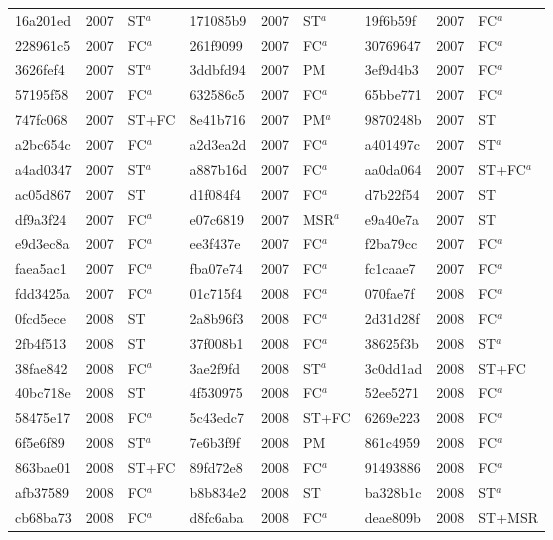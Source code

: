 \begin{longtable}{lll@{\hspace{10pt}}lll@{\hspace{10pt}}lll}
16a201ed & 2007 & ST$^{a}$ & 171085b9 & 2007 & ST$^{a}$ & 19f6b59f & 2007 & FC$^{a}$ \\
228961c5 & 2007 & FC$^{a}$ & 261f9099 & 2007 & FC$^{a}$ & 30769647 & 2007 & FC$^{a}$ \\
3626fef4 & 2007 & ST$^{a}$ & 3ddbfd94 & 2007 & PM & 3ef9d4b3 & 2007 & FC$^{a}$ \\
57195f58 & 2007 & FC$^{a}$ & 632586c5 & 2007 & FC$^{a}$ & 65bbe771 & 2007 & FC$^{a}$ \\
747fc068 & 2007 & ST+FC & 8e41b716 & 2007 & PM$^{a}$ & 9870248b & 2007 & ST \\
a2bc654c & 2007 & FC$^{a}$ & a2d3ea2d & 2007 & FC$^{a}$ & a401497c & 2007 & ST$^{a}$ \\
a4ad0347 & 2007 & ST$^{a}$ & a887b16d & 2007 & FC$^{a}$ & aa0da064 & 2007 & ST+FC$^{a}$ \\
ac05d867 & 2007 & ST & d1f084f4 & 2007 & FC$^{a}$ & d7b22f54 & 2007 & ST \\
df9a3f24 & 2007 & FC$^{a}$ & e07c6819 & 2007 & MSR$^{a}$ & e9a40e7a & 2007 & ST \\
e9d3ec8a & 2007 & FC$^{a}$ & ee3f437e & 2007 & FC$^{a}$ & f2ba79cc & 2007 & FC$^{a}$ \\
faea5ac1 & 2007 & FC$^{a}$ & fba07e74 & 2007 & FC$^{a}$ & fc1caae7 & 2007 & FC$^{a}$ \\
fdd3425a & 2007 & FC$^{a}$ & 01c715f4 & 2008 & FC$^{a}$ & 070fae7f & 2008 & FC$^{a}$ \\
0fcd5ece & 2008 & ST & 2a8b96f3 & 2008 & FC$^{a}$ & 2d31d28f & 2008 & FC$^{a}$ \\
2fb4f513 & 2008 & ST & 37f008b1 & 2008 & FC$^{a}$ & 38625f3b & 2008 & ST$^{a}$ \\
38fae842 & 2008 & FC$^{a}$ & 3ae2f9fd & 2008 & ST$^{a}$ & 3c0dd1ad & 2008 & ST+FC \\
40bc718e & 2008 & ST & 4f530975 & 2008 & FC$^{a}$ & 52ee5271 & 2008 & FC$^{a}$ \\
58475e17 & 2008 & FC$^{a}$ & 5c43edc7 & 2008 & ST+FC & 6269e223 & 2008 & FC$^{a}$ \\
6f5e6f89 & 2008 & ST$^{a}$ & 7e6b3f9f & 2008 & PM & 861c4959 & 2008 & FC$^{a}$ \\
863bae01 & 2008 & ST+FC & 89fd72e8 & 2008 & FC$^{a}$ & 91493886 & 2008 & FC$^{a}$ \\
afb37589 & 2008 & FC$^{a}$ & b8b834e2 & 2008 & ST & ba328b1c & 2008 & ST$^{a}$ \\
cb68ba73 & 2008 & FC$^{a}$ & d8fc6aba & 2008 & FC$^{a}$ & deae809b & 2008 & ST+MSR \\

\end{longtable}
